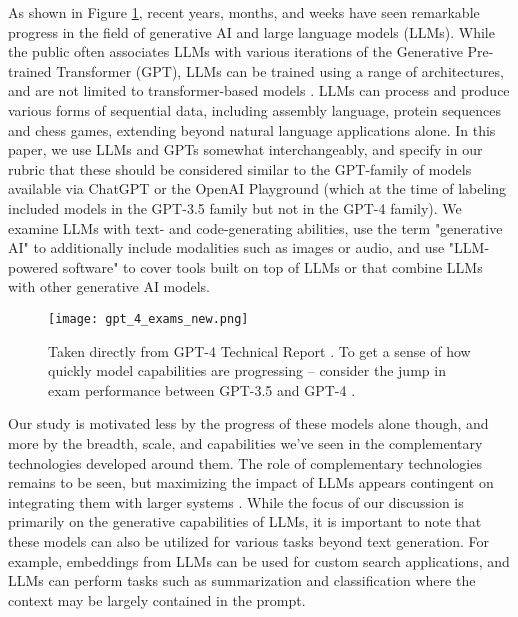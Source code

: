 \documentclass[11pt]{article}
\begin{document}
As shown in Figure \ref{fig:exames}, recent years, months, and weeks have seen remarkable progress in the field of generative AI and large language models (LLMs). While the public often associates LLMs with various iterations of the Generative Pre-trained Transformer (GPT), LLMs can be trained using a range of architectures, and are not limited to transformer-based models \citep{47751}. LLMs can process and produce various forms of sequential data, including assembly language, protein sequences and chess games, extending beyond natural language applications alone. In this paper, we use LLMs and GPTs somewhat interchangeably, and specify in our rubric that these should be considered similar to the GPT-family of models available via ChatGPT or the OpenAI Playground (which at the time of labeling included models in the GPT-3.5 family but not in the GPT-4 family). We examine LLMs with text- and code-generating abilities, use the term "generative AI" to additionally include modalities such as images or audio, and use "LLM-powered software" to cover tools built on top of LLMs or that combine LLMs with other generative AI models.

\begin{figure}
    \centering
    \texttt{[image: gpt\_4\_exams\_new.png]}
    \caption{Taken directly from GPT-4 Technical Report \citep{gpt4}. To get a sense of how quickly model capabilities are progressing -- consider the jump in exam performance between GPT-3.5 and GPT-4 \citep{gpt4}.}
    \label{fig:exames}
\end{figure}

Our study is motivated less by the progress of these models alone though, and more by the breadth, scale, and capabilities we've seen in the complementary technologies developed around them. The role of complementary technologies remains to be seen, but maximizing the impact of LLMs appears contingent on integrating them with larger systems \citep{bresnahan2019artificial, agrawal2021ai}. While the focus of our discussion is primarily on the generative capabilities of LLMs, it is important to note that these models can also be utilized for various tasks beyond text generation. For example, embeddings from LLMs can be used for custom search applications, and LLMs can perform tasks such as summarization and classification where the context may be largely contained in the prompt.
\end{document}
